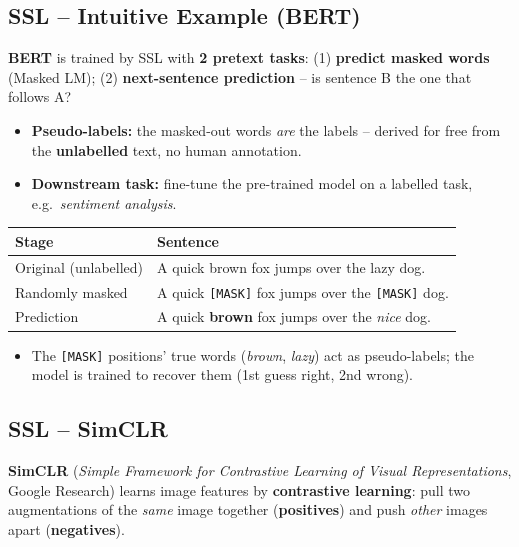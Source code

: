 \documentclass[10pt,a4paper]{article}
\begin{document}
	\subsection{SSL -- Intuitive Example (BERT)}

	\begin{importantbox}
		\textbf{BERT} is trained by SSL with \textbf{2 pretext tasks}: (1) \textbf{predict masked words} (Masked LM); (2) \textbf{next-sentence prediction} -- is sentence B the one that follows A?
	\end{importantbox}

	\begin{itemize}[leftmargin=*]
		\item \textbf{Pseudo-labels:} the masked-out words \emph{are} the labels -- derived for free from the \textbf{unlabelled} text, no human annotation.
		\item \textbf{Downstream task:} fine-tune the pre-trained model on a labelled task, e.g.\ \emph{sentiment analysis}.
	\end{itemize}

	\begin{center}
	\begin{tabular}{@{}ll@{}}
		\toprule
		\textbf{Stage} & \textbf{Sentence} \\
		\midrule
		Original (unlabelled) & A quick brown fox jumps over the lazy dog. \\
		Randomly masked       & A quick \texttt{[MASK]} fox jumps over the \texttt{[MASK]} dog. \\
		Prediction            & A quick \textbf{brown} fox jumps over the \emph{nice} dog. \\
		\bottomrule
	\end{tabular}
	\end{center}

	\begin{itemize}[leftmargin=*]
		\item The \texttt{[MASK]} positions' true words (\emph{brown}, \emph{lazy}) act as pseudo-labels; the model is trained to recover them (1st guess right, 2nd wrong).
	\end{itemize}

	\subsection{SSL -- SimCLR}

	\begin{definitionbox}
		\textbf{SimCLR} (\emph{Simple Framework for Contrastive Learning of Visual Representations}, Google Research) learns image features by \textbf{contrastive learning}: pull two augmentations of the \emph{same} image together (\textbf{positives}) and push \emph{other} images apart (\textbf{negatives}).
	\end{definitionbox}
\end{document}
